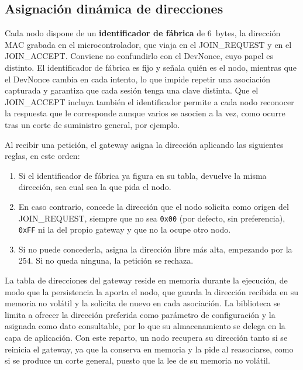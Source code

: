 \subsection{Asignación dinámica de direcciones}\label{sec:direcciones}

Cada nodo dispone de un \textbf{identificador de fábrica} de 6~bytes, la dirección MAC grabada en el microcontrolador, que viaja en el JOIN\_REQUEST y en el JOIN\_ACCEPT. Conviene no confundirlo con el DevNonce, cuyo papel es distinto. El identificador de fábrica es fijo y señala quién es el nodo, mientras que el DevNonce cambia en cada intento, lo que impide repetir una asociación capturada y garantiza que cada sesión tenga una clave distinta. Que el JOIN\_ACCEPT incluya también el identificador permite a cada nodo reconocer la respuesta que le corresponde aunque varios se asocien a la vez, como ocurre tras un corte de suministro general, por ejemplo.

Al recibir una petición, el gateway asigna la dirección aplicando las siguientes reglas, en este orden:

\begin{enumerate}
\item Si el identificador de fábrica ya figura en su tabla, devuelve la misma dirección, sea cual sea la que pida el nodo.

\item En caso contrario, concede la dirección que el nodo solicita como origen del JOIN\_REQUEST, siempre que no sea \texttt{0x00} (por defecto, sin preferencia), \texttt{0xFF} ni la del propio gateway y que no la ocupe otro nodo.

\item Si no puede concederla, asigna la dirección libre más alta, empezando por la 254. Si no queda ninguna, la petición se rechaza.
\end{enumerate}

La tabla de direcciones del gateway reside en memoria durante la ejecución, de modo que la persistencia la aporta el nodo, que guarda la dirección recibida en su memoria no volátil y la solicita de nuevo en cada asociación. La biblioteca se limita a ofrecer la dirección preferida como parámetro de configuración y la asignada como dato consultable, por lo que su almacenamiento se delega en la capa de aplicación. Con este reparto, un nodo recupera su dirección tanto si se reinicia el gateway, ya que la conserva en memoria y la pide al reasociarse, como si se produce un corte general, puesto que la lee de su memoria no volátil.

